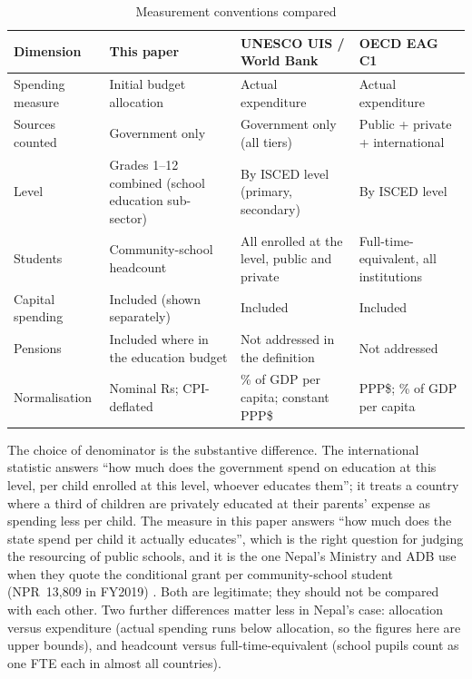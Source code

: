 \documentclass[11pt,a4paper]{article}
\begin{document}
\begin{table}[htbp]\centering\small
\caption{Measurement conventions compared}\label{tab:defs}
\begin{tabularx}{\textwidth}{lLLL}\toprule
Dimension & This paper & UNESCO UIS / World Bank & OECD EAG C1 \\\midrule
Spending measure & Initial budget allocation & Actual expenditure & Actual expenditure \\
Sources counted & Government only & Government only (all tiers) & Public + private + international \\
Level & Grades 1--12 combined (school education sub-sector) & By ISCED level (primary, secondary) & By ISCED level \\
Students & Community-school headcount & All enrolled at the level, public and private & Full-time-equivalent, all institutions \\
Capital spending & Included (shown separately) & Included & Included \\
Pensions & Included where in the education budget & Not addressed in the definition & Not addressed \\
Normalisation & Nominal Rs; CPI-deflated & \% of GDP per capita; constant PPP\$ & PPP\$; \% of GDP per capita \\
\bottomrule\end{tabularx}
\end{table}

The choice of denominator is the substantive difference. The international statistic answers ``how much does the government spend on education at this level, per child enrolled at this level, whoever educates them''; it treats a country where a third of children are privately educated at their parents' expense as spending less per child. The measure in this paper answers ``how much does the state spend per child it actually educates'', which is the right question for judging the resourcing of public schools, and it is the one Nepal's Ministry and ADB use when they quote the conditional grant per community-school student (NPR~13,809 in FY2019) \cite{adb2021}. Both are legitimate; they should not be compared with each other. Two further differences matter less in Nepal's case: allocation versus expenditure (actual spending runs below allocation, so the figures here are upper bounds), and headcount versus full-time-equivalent (school pupils count as one FTE each in almost all countries).
\end{document}
